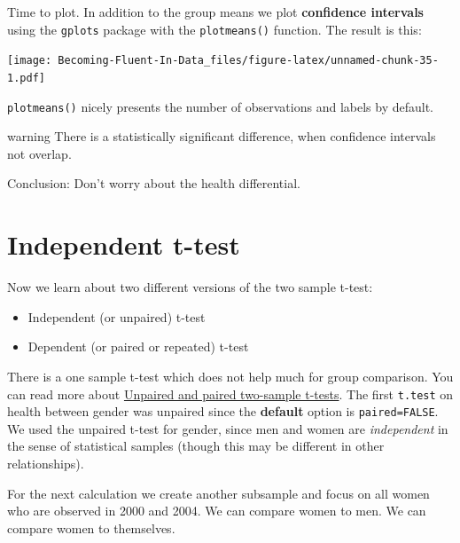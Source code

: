 \documentclass[
]{book}
\providecommand{\tightlist}{%
  \setlength{\itemsep}{0pt}\setlength{\parskip}{0pt}}
\begin{document}
Time to plot. In addition to the group means we plot \textbf{confidence intervals} using the \texttt{gplots} package with the \texttt{plotmeans()} function. The result is this:

\texttt{[image: Becoming-Fluent-In-Data\_files/figure-latex/unnamed-chunk-35-1.pdf]}

\texttt{plotmeans()} nicely presents the number of observations and labels by default.

\begin{infobox2}warning
There is a statistically significant difference, when confidence intervals not overlap.

\end{infobox2}

Conclusion: Don't worry about the health differential.

\hypertarget{independent-t-test}{%
\section{Independent t-test}\label{independent-t-test}}

Now we learn about two different versions of the two sample t-test:

\begin{itemize}
\tightlist
\item
  Independent (or unpaired) t-test
\item
  Dependent (or paired or repeated) t-test
\end{itemize}

There is a one sample t-test which does not help much for group comparison. You can read more about \href{https://en.wikipedia.org/wiki/Student\%27s_t-test\#\#Unpaired_and_paired_two-sample_t-tests}{Unpaired and paired two-sample t-tests}. The first \texttt{t.test} on health between gender was unpaired since the \textbf{default} option is \texttt{paired=FALSE}. We used the unpaired t-test for gender, since men and women are \emph{independent} in the sense of statistical samples (though this may be different in other relationships).

For the next calculation we create another subsample and focus on all women who are observed in 2000 and 2004. We can compare women to men. We can compare women to themselves.
\end{document}
